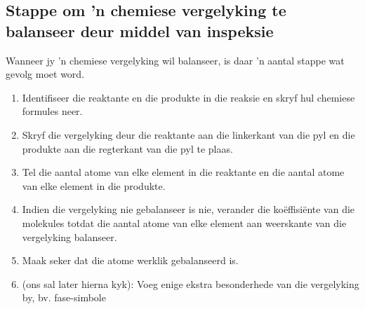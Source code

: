             \subsection*{Stappe om 'n chemiese vergelyking te balanseer deur middel van inspeksie}
            \nopagebreak
Wanneer jy 'n chemiese vergelyking wil balanseer, is daar 'n aantal stappe wat gevolg moet word.
        \label{m38726*id63712}\begin{enumerate}[noitemsep, label=\textbf{Stap \arabic*}:]
\item Identifiseer die reaktante en die produkte in die reaksie en skryf hul chemiese formules neer.
\item Skryf die vergelyking deur die reaktante aan die linkerkant van die pyl en die produkte aan die regterkant van die pyl te plaas.
\item Tel die aantal atome van elke element in die reaktante en die aantal atome van elke element in die produkte.
\item Indien die vergelyking nie gebalanseer is nie, verander die koëffisiënte van die molekules totdat die aantal atome van elke element aan weerskante van die vergelyking balanseer.
\item Maak seker dat die atome werklik gebalanseerd is.
\item (ons sal later hierna kyk): Voeg enige ekstra besonderhede van die vergelyking by, bv. fase-simbole
\end{enumerate}
\par
            \label{m38726*secfhsst!!!underscore!!!id296}
      \noindent
